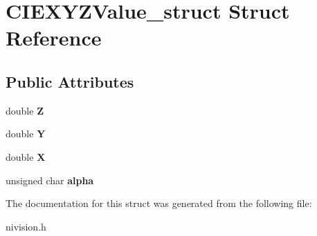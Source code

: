 \hypertarget{structCIEXYZValue__struct}{
\section{CIEXYZValue\_\-struct Struct Reference}
\label{structCIEXYZValue__struct}
}
\subsection*{Public Attributes}
\begin{DoxyCompactItemize}
\item 
\hypertarget{structCIEXYZValue__struct_a64baa30848c89350d473d7129b1a26cc}{
double {\bfseries Z}}
\label{structCIEXYZValue__struct_a64baa30848c89350d473d7129b1a26cc}

\item 
\hypertarget{structCIEXYZValue__struct_a0bec3491b0e4eff1f583752345fca2d4}{
double {\bfseries Y}}
\label{structCIEXYZValue__struct_a0bec3491b0e4eff1f583752345fca2d4}

\item 
\hypertarget{structCIEXYZValue__struct_a95a67b9cddbde6537326b42acda21fb7}{
double {\bfseries X}}
\label{structCIEXYZValue__struct_a95a67b9cddbde6537326b42acda21fb7}

\item 
\hypertarget{structCIEXYZValue__struct_a9ed64a23d999c394e7498e9d6c065f82}{
unsigned char {\bfseries alpha}}
\label{structCIEXYZValue__struct_a9ed64a23d999c394e7498e9d6c065f82}

\end{DoxyCompactItemize}


The documentation for this struct was generated from the following file:\begin{DoxyCompactItemize}
\item 
nivision.h\end{DoxyCompactItemize}
